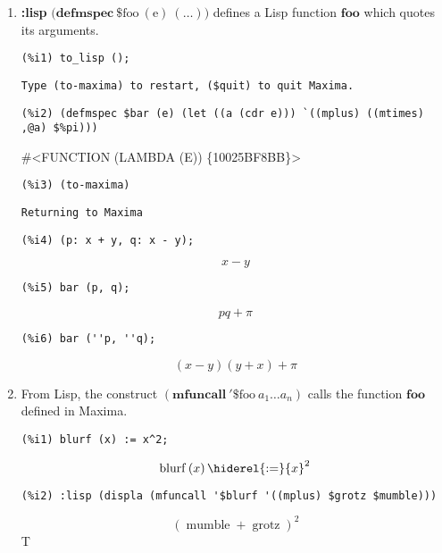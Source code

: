 \documentclass[12pt,leqno]{article}
\begin{document}
\begin{enumerate}
\item {\bf :lisp} $\mathrm{(}\mathbf{defmspec\ } \mathrm{\$foo\ (e)\ (\ldots))}$
defines a Lisp function $\mathbf{foo}$ which quotes its arguments.
\begin{verbatim}
(%i1) to_lisp ();
\end{verbatim}
\begin{Verbatim}
Type (to-maxima) to restart, ($quit) to quit Maxima.
\end{Verbatim}
\begin{verbatim}
(%i2) (defmspec $bar (e) (let ((a (cdr e))) `((mplus) ((mtimes) ,@a) $%pi)))
\end{verbatim}
\#\textless FUNCTION (LAMBDA (E)) \{10025BF8BB\}\textgreater
\begin{verbatim}
(%i3) (to-maxima)
\end{verbatim}
\begin{Verbatim}
Returning to Maxima
\end{Verbatim}
\begin{verbatim}
(%i4) (p: x + y, q: x - y);
\end{verbatim}
\begin{dmath}[number={\(\mathop{\mathrm{\%o}_{2}}\)}]
x-y
\end{dmath}
\begin{verbatim}
(%i5) bar (p, q);
\end{verbatim}
\begin{dmath}[number={\(\mathop{\mathrm{\%o}_{3}}\)}]
p q+\pi
\end{dmath}
\begin{verbatim}
(%i6) bar (''p, ''q);
\end{verbatim}
\begin{dmath}[number={\(\mathop{\mathrm{\%o}_{4}}\)}]
\left(x-y\right) \left(y+x\right)+\pi
\end{dmath}


\item From Lisp, the construct $(\mathbf{mfuncall\ '\$}\mathrm{foo\ }a_1 \ldots a_n)$
calls the function $\mathbf{foo}$ defined in Maxima.

\begin{verbatim}
(%i1) blurf (x) := x^2;
\end{verbatim}
\begin{dmath}[number={\(\mathop{\mathrm{\%o}_{1}}\)}]
\mathop{\mathrm{blurf}}\left(x\right) \hiderel{:=} {x}^{2}
\end{dmath}
\begin{verbatim}
(%i2) :lisp (displa (mfuncall '$blurf '((mplus) $grotz $mumble)))
\end{verbatim}
\begin{dmath*}
{\left(\mathop{\mathrm{mumble}}+\mathop{\mathrm{grotz}}\right)}^{2}
\label{eq:doc-group1-code39-2-1}
\end{dmath*}
T

\end{enumerate}
\end{document}
